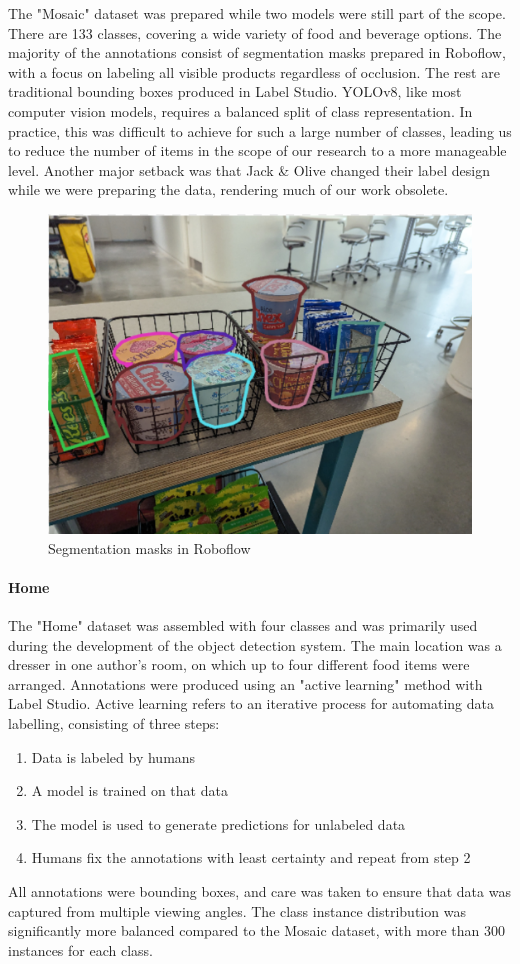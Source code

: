 \documentclass[thesis]{fputhesis}
\begin{document}
\begin{body}
The "Mosaic" dataset was prepared while two models were still part of the scope. There are 133 classes, covering a wide variety of food and beverage options. The majority of the annotations consist of segmentation masks prepared in Roboflow\cite{Roboflow}, with a focus on labeling all visible products regardless of occlusion. The rest are traditional bounding boxes produced in Label Studio\cite{LabelStudio}. 
YOLOv8, like most computer vision models, requires a balanced split of class representation. In practice, this was difficult to achieve for such a large number of classes, leading us to reduce the number of items in the scope of our research to a more manageable level. 
Another major setback was that Jack \& Olive changed their label design while we were preparing the data, rendering much of our work obsolete. 

\begin{figure}[h]
    \centering
    \includegraphics[width=0.5\linewidth]{Images/mask-data.png}
    \caption{Segmentation masks in Roboflow}
    \label{fig:seg-masks}
\end{figure}

\paragraph{Home}
The "Home" dataset was assembled with four classes and was primarily used during the development of the object detection system. The main location was a dresser in one author's room, on which up to four different food items were arranged. Annotations were produced using an "active learning" method with Label Studio. Active learning refers to an iterative process for automating data labelling, consisting of three steps:
\begin{enumerate}
    \item Data is labeled by humans
    \item A model is trained on that data
    \item The model is used to generate predictions for unlabeled data
    \item Humans fix the annotations with least certainty and repeat from step 2
\end{enumerate}
All annotations were bounding boxes, and care was taken to ensure that data was captured from multiple viewing angles. The class instance distribution was significantly more balanced compared to the Mosaic dataset, with more than 300 instances for each class. 


\end{body}
\end{document}
